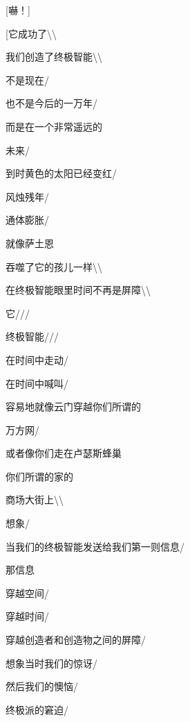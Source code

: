 \documentclass[AutoFakeBold=true]{book}
\begin{document}
{

[嚇！]

[它成功了\textbackslash\textbackslash

我们创造了终极智能\textbackslash\textbackslash

不是现在/

也不是今后的一万年/

而是在一个非常遥远的

未来/

到时黄色的太阳已经变红/

风烛残年/

通体膨胀/

就像萨土恩

吞噬了它的孩儿一样\textbackslash\textbackslash

在终极智能眼里时间不再是屏障\textbackslash\textbackslash

它///

终极智能///

在时间中走动/

在时间中喊叫/

容易地就像云门穿越你们所谓的

万方网/

或者像你们走在卢瑟斯蜂巢

你们所谓的家的

商场大街上\textbackslash\textbackslash

想象/

当我们的终极智能发送给我们第一则信息/

那信息

穿越空间/

穿越时间/

穿越创造者和创造物之间的屏障/

想象当时我们的惊讶/

然后我们的懊恼/

终极派的窘迫/

}
\end{document}
